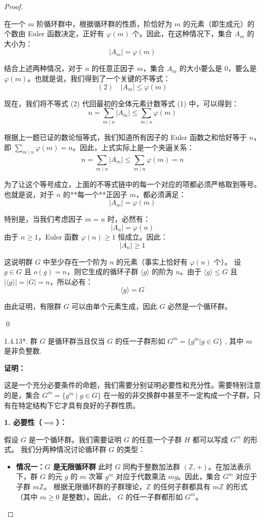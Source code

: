 \documentclass[]{article}
\begin{document}
\begin{proof}
\begin{itemize}
	在一个 $m$ 阶循环群中，根据循环群的性质，阶恰好为 $m$ 的元素（即生成元）的个数由 Euler 函数决定，正好有 $\varphi(m)$ 个。因此，在这种情况下，集合 $A_m$ 的大小为：
	\[ |A_m| = \varphi(m) \]
\end{itemize}

结合上述两种情况，对于 $n$ 的任意正因子 $m$，集合 $A_m$ 的大小要么是 $0$，要么是 $\varphi(m)$。也就是说，我们得到了一个关键的不等式：
\[ (2) \quad |A_m| \le \varphi(m) \]

现在，我们将不等式 (2) 代回最初的全体元素计数等式 (1) 中，可以得到：
\[ n = \sum_{m \mid n} |A_m| \le \sum_{m \mid n} \varphi(m) \]

根据上一题已证的数论恒等式，我们知道所有因子的 Euler 函数之和恰好等于 $n$，即 $\sum_{m \mid n} \varphi(m) = n$。因此，上式实际上是一个夹逼关系：
\[ n = \sum_{m \mid n} |A_m| \le \sum_{m \mid n} \varphi(m) = n \]

为了让这个等号成立，上面的不等式链中的每一个对应的项都必须严格取到等号。也就是说，对于 $n$ 的**每一个**正因子 $m$，都必须满足：
\[ |A_m| = \varphi(m) \]

特别是，当我们考虑因子 $m = n$ 时，必然有：
\[ |A_n| = \varphi(n) \]
由于 $n \ge 1$，Euler 函数 $\varphi(n) \ge 1$ 恒成立。因此：
\[ |A_n| \ge 1 \]

这说明群 $G$ 中至少存在一个阶为 $n$ 的元素（事实上恰好有 $\varphi(n)$ 个）。
设 $g \in G$ 且 $o(g) = n$，则它生成的循环子群 $\langle g \rangle$ 的阶为 $n$。由于 $\langle g \rangle \le G$ 且 $|\langle g \rangle| = |G| = n$，所以必有：
\[ \langle g \rangle = G \]

由此证明，有限群 $G$ 可以由单个元素生成，因此 $G$ 必然是一个循环群。

\qed

1.4.13*. 群 $G$ 是循环群当且仅当 $G$ 的任一子群形如 $G^{m} = \{g^{m} | g \in G\}$ , 其中 $m$ 是非负整数. 

\bigskip
\noindent \textbf{证明：} 

这是一个充分必要条件的命题，我们需要分别证明必要性和充分性。需要特别注意的是，集合 $G^m = \{g^m \mid g \in G\}$ 在一般的非交换群中甚至不一定构成一个子群，只有在特定结构下它才具有良好的子群性质。

\bigskip
\noindent \textbf{1. 必要性（$\implies$）：}

假设 $G$ 是一个循环群。我们需要证明 $G$ 的任意一个子群 $H$ 都可以写成 $G^m$ 的形式。
我们分两种情况讨论循环群 $G$ 的类型：

\begin{itemize}
	\item \textbf{情况一：$G$ 是无限循环群}
	此时 $G$ 同构于整数加法群 $(\mathbb{Z}, +)$。在加法表示下，群 $G$ 的元 $g$ 的 $m$ 次幂 $g^m$ 对应于代数乘法 $mg$。因此，集合 $G^m$ 对应于子群 $m\mathbb{Z}$。
	根据无限循环群的子群理论，$\mathbb{Z}$ 的任何子群都具有 $m\mathbb{Z}$ 的形式（其中 $m \ge 0$ 是整数）。因此， $G$ 的任一子群都形如 $G^m$。
	

\end{itemize}
\end{proof}
\end{document}
